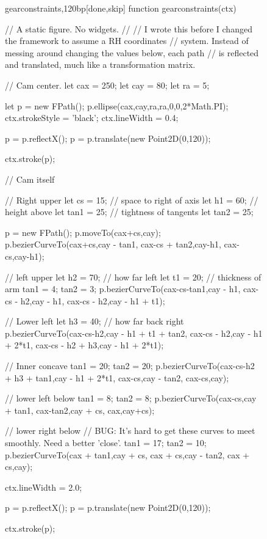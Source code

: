 \documentclass[10pt]{article}
\begin{document}
\begin{figure}
\begin{figput}{gearconstraints,120bp}[done,skip]
function gearconstraints(ctx) {

  // A static figure. No widgets.
  //
  // I wrote this before I changed the framework to assume a RH coordinates
  // system. Instead of messing around changing the values below, each path
  // is reflected and translated, much like a transformation matrix.

  // Cam center.
  let cax = 250;
  let cay = 80;
  let ra = 5;

  let p = new FPath();
  p.ellipse(cax,cay,ra,ra,0,0,2*Math.PI);
  ctx.strokeStyle = 'black';
  ctx.lineWidth = 0.4;

  p = p.reflectX();
  p = p.translate(new Point2D(0,120));
  
  ctx.stroke(p);

  // Cam itself

  // Right upper
  let cs = 15; // space to right of axis
  let h1 = 60; // height above 
  let tan1 = 25; // tightness of tangents
  let tan2 = 25;

  p = new FPath();
  p.moveTo(cax+cs,cay);
  p.bezierCurveTo(cax+cs,cay - tan1,
    cax-cs + tan2,cay-h1,
    cax-cs,cay-h1);

  // left upper
  let h2 = 70; // how far left
  let t1 = 20; // thickness of arm
  tan1 = 4;
  tan2 = 3;
  p.bezierCurveTo(cax-cs-tan1,cay - h1,
    cax-cs - h2,cay - h1,
    cax-cs - h2,cay - h1 + t1);

  // Lower left
  let h3 = 40; // how far back right
  p.bezierCurveTo(cax-cs-h2,cay - h1 + t1 + tan2,
    cax-cs - h2,cay - h1 + 2*t1,
    cax-cs - h2 + h3,cay - h1 + 2*t1);

  // Inner concave
  tan1 = 20;
  tan2 = 20;
  p.bezierCurveTo(cax-cs-h2 + h3 + tan1,cay - h1 + 2*t1,
    cax-cs,cay - tan2,
    cax-cs,cay);

  // lower left below
  tan1 = 8;
  tan2 = 8;
  p.bezierCurveTo(cax-cs,cay + tan1,
    cax-tan2,cay + cs,
    cax,cay+cs);

  // lower right below
  // BUG: It's hard to get these curves to meet smoothly. Need a better 'close'.
  tan1 = 17;
  tan2 = 10;
  p.bezierCurveTo(cax + tan1,cay + cs,
    cax + cs,cay - tan2,
    cax + cs,cay);

  ctx.lineWidth = 2.0;

  p = p.reflectX();
  p = p.translate(new Point2D(0,120));
  
  ctx.stroke(p);

}
\end{figput}
\end{figure}
\end{document}
